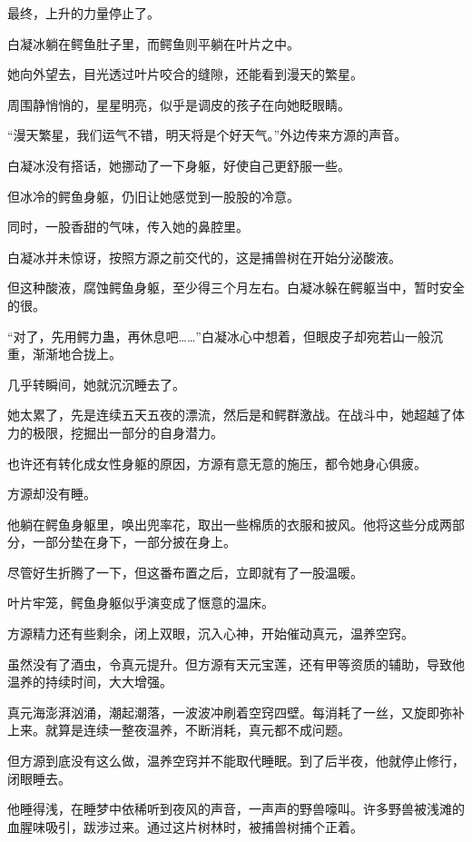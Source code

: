 \begin{this_body}
最终，上升的力量停止了。

白凝冰躺在鳄鱼肚子里，而鳄鱼则平躺在叶片之中。

她向外望去，目光透过叶片咬合的缝隙，还能看到漫天的繁星。

周围静悄悄的，星星明亮，似乎是调皮的孩子在向她眨眼睛。

“漫天繁星，我们运气不错，明天将是个好天气。”外边传来方源的声音。

白凝冰没有搭话，她挪动了一下身躯，好使自己更舒服一些。

但冰冷的鳄鱼身躯，仍旧让她感觉到一股股的冷意。

同时，一股香甜的气味，传入她的鼻腔里。

白凝冰并未惊讶，按照方源之前交代的，这是捕兽树在开始分泌酸液。

但这种酸液，腐蚀鳄鱼身躯，至少得三个月左右。白凝冰躲在鳄躯当中，暂时安全的很。

“对了，先用鳄力蛊，再休息吧……”白凝冰心中想着，但眼皮子却宛若山一般沉重，渐渐地合拢上。

几乎转瞬间，她就沉沉睡去了。

她太累了，先是连续五天五夜的漂流，然后是和鳄群激战。在战斗中，她超越了体力的极限，挖掘出一部分的自身潜力。

也许还有转化成女性身躯的原因，方源有意无意的施压，都令她身心俱疲。

方源却没有睡。

他躺在鳄鱼身躯里，唤出兜率花，取出一些棉质的衣服和披风。他将这些分成两部分，一部分垫在身下，一部分披在身上。

尽管好生折腾了一下，但这番布置之后，立即就有了一股温暖。

叶片牢笼，鳄鱼身躯似乎演变成了惬意的温床。

方源精力还有些剩余，闭上双眼，沉入心神，开始催动真元，温养空窍。

虽然没有了酒虫，令真元提升。但方源有天元宝莲，还有甲等资质的辅助，导致他温养的持续时间，大大增强。

真元海澎湃汹涌，潮起潮落，一波波冲刷着空窍四壁。每消耗了一丝，又旋即弥补上来。就算是连续一整夜温养，不断消耗，真元都不成问题。

但方源到底没有这么做，温养空窍并不能取代睡眠。到了后半夜，他就停止修行，闭眼睡去。

他睡得浅，在睡梦中依稀听到夜风的声音，一声声的野兽嚎叫。许多野兽被浅滩的血腥味吸引，跋涉过来。通过这片树林时，被捕兽树捕个正着。

\end{this_body}

